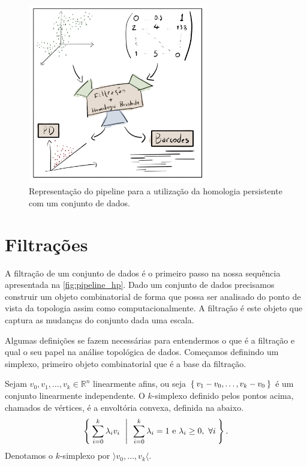 \begin{figure}
  \centering
  \includegraphics[width=0.7\textwidth]{images/pipeline_hp.png}
  \caption{Representação do pipeline para a utilização da homologia persistente
          com um conjunto de dados.}
  \label{fig:pipeline_hp}
\end{figure}


\section{Filtrações}
A filtração de um conjunto de dados é o primeiro passo na nossa sequência apresentada
na \autoref{fig:pipeline_hp}.
Dado um conjunto de dados precisamos construir um objeto combinatorial de forma
que possa ser analisado do ponto de vista da topologia assim como computacionalmente.
A filtração é este objeto que captura as mudanças do conjunto dada uma escala.

Algumas definições se fazem necessárias para entendermos o que é a filtração
e qual o seu papel na análise topológica de dados. Começamos definindo um simplexo,
primeiro objeto combinatorial que é a base da filtração.

\begin{defi}
  Sejam $v_0, v_1, \dots, v_k \in \mathbb{R}^n$ linearmente afins, ou seja $\Set{v_1 - v_0, \dots, v_k - v_0}$
  é um conjunto linearmente independente. O $k$-simplexo definido pelos pontos acima,
  chamados de vértices, é a envoltória convexa, definida na abaixo.
  \begin{equation}
    \label{eq:envconv}
    \Set{\sum_{i=0}^k \lambda_i v_i \ | \ \sum_{i=0}^k \lambda_i = 1 \text{ e }
          \lambda_i \ge 0, \ \forall i}.
  \end{equation}
  Denotamos o $k$-simplexo por $\rangle v_0, \dots, v_k \langle$.
\end{defi}

